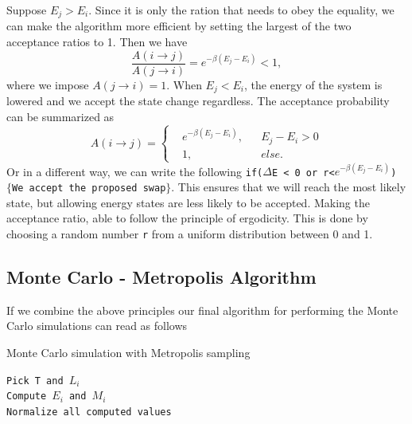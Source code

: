 \documentclass[%
reprint,
nofootinbib,
amsmath,amssymb,
aps,
]{revtex4-1}
\begin{document}
Suppose $E_j > E_i$. Since it is only the ration that needs to obey the equality, we can make the algorithm more efficient by setting the largest of the two acceptance ratios to 1. 
Then we have 
\begin{equation}
		\frac{A(i\rightarrow j)}{A(j\rightarrow i)} = e^{-\beta \left(E_j - E_i\right)} < 1,
\end{equation}
where we impose $A(j\rightarrow i) = 1$. When $E_j < E_i$, the energy of the system is lowered and we accept the state change regardless. The acceptance probability can be summarized as 
\begin{equation}
	A(i \rightarrow j) = 
	\left\lbrace
	\begin{split}
		&e^{-\beta \left(E_j - E_i\right)},  && E_j - E_i > 0\\
		&1, && else.
	\end{split}
	\right.
\end{equation} 
Or in a different way, we can write the following \texttt{if($\Delta$E < 0 or r<$e^{-\beta \left(E_j - E_i\right)}$) $\lbrace$We accept the proposed swap$\rbrace$}. This ensures that we will reach the most likely state, but allowing energy states are less likely to be accepted. Making the acceptance ratio, able to follow the principle of ergodicity. This is done by choosing a random number \texttt{r} from a uniform distribution between 0 and 1.

\subsection{Monte Carlo - Metropolis Algorithm}%
If we combine the above principles our final algorithm for performing the Monte Carlo simulations can read as follows
\begin{algorithm}[H]\label{algo:metropolis}
	\SetAlgoLined
	\caption{Monte Carlo simulation with Metropolis sampling}
	\texttt{Pick T and $L_i$}	\\
	\texttt{Compute $E_i$ and $M_i$}\\
	\texttt{Normalize all computed values}
\end{algorithm}
\end{document}
